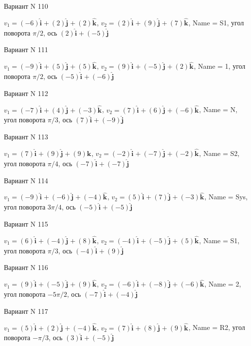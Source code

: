 \documentclass[11pt]{report}
\begin{document}
Вариант N 110

$v_1 = (-6)\mathbf{\hat{i}_{}} + (2)\mathbf{\hat{j}_{}} + (2)\mathbf{\hat{k}_{}}$, $v_2 = (2)\mathbf{\hat{i}_{}} + (9)\mathbf{\hat{j}_{}} + (7)\mathbf{\hat{k}_{}}$, Name = S1, угол поворота $\pi / 2$, ось $(2)\mathbf{\hat{i}_{}} + (-5)\mathbf{\hat{j}_{}}$

Вариант N 111

$v_1 = (-9)\mathbf{\hat{i}_{}} + (5)\mathbf{\hat{j}_{}} + (5)\mathbf{\hat{k}_{}}$, $v_2 = (9)\mathbf{\hat{i}_{}} + (-5)\mathbf{\hat{j}_{}} + (2)\mathbf{\hat{k}_{}}$, Name = 1, угол поворота $\pi / 2$, ось $(-5)\mathbf{\hat{i}_{}} + (-6)\mathbf{\hat{j}_{}}$

Вариант N 112

$v_1 = (-7)\mathbf{\hat{i}_{}} + (4)\mathbf{\hat{j}_{}} + (-3)\mathbf{\hat{k}_{}}$, $v_2 = (7)\mathbf{\hat{i}_{}} + (6)\mathbf{\hat{j}_{}} + (-6)\mathbf{\hat{k}_{}}$, Name = N, угол поворота $\pi / 3$, ось $(7)\mathbf{\hat{i}_{}} + (-9)\mathbf{\hat{j}_{}}$

Вариант N 113

$v_1 = (7)\mathbf{\hat{i}_{}} + (9)\mathbf{\hat{j}_{}} + (9)\mathbf{\hat{k}_{}}$, $v_2 = (-2)\mathbf{\hat{i}_{}} + (-7)\mathbf{\hat{j}_{}} + (-2)\mathbf{\hat{k}_{}}$, Name = S2, угол поворота $\pi / 4$, ось $(-7)\mathbf{\hat{i}_{}} + (-7)\mathbf{\hat{j}_{}}$

Вариант N 114

$v_1 = (-9)\mathbf{\hat{i}_{}} + (-6)\mathbf{\hat{j}_{}} + (-4)\mathbf{\hat{k}_{}}$, $v_2 = (5)\mathbf{\hat{i}_{}} + (7)\mathbf{\hat{j}_{}} + (-3)\mathbf{\hat{k}_{}}$, Name = Sys, угол поворота $3 \pi / 4$, ось $(-5)\mathbf{\hat{i}_{}} + (-5)\mathbf{\hat{j}_{}}$

Вариант N 115

$v_1 = (6)\mathbf{\hat{i}_{}} + (-4)\mathbf{\hat{j}_{}} + (8)\mathbf{\hat{k}_{}}$, $v_2 = (-4)\mathbf{\hat{i}_{}} + (-5)\mathbf{\hat{j}_{}} + (5)\mathbf{\hat{k}_{}}$, Name = S1, угол поворота $\pi / 3$, ось $(-4)\mathbf{\hat{i}_{}} + (9)\mathbf{\hat{j}_{}}$

Вариант N 116

$v_1 = (9)\mathbf{\hat{i}_{}} + (-5)\mathbf{\hat{j}_{}} + (9)\mathbf{\hat{k}_{}}$, $v_2 = (-6)\mathbf{\hat{i}_{}} + (-8)\mathbf{\hat{j}_{}} + (-6)\mathbf{\hat{k}_{}}$, Name = 2, угол поворота $- 5 \pi / 2$, ось $(-7)\mathbf{\hat{i}_{}} + (-4)\mathbf{\hat{j}_{}}$

Вариант N 117

$v_1 = (5)\mathbf{\hat{i}_{}} + (2)\mathbf{\hat{j}_{}} + (-4)\mathbf{\hat{k}_{}}$, $v_2 = (7)\mathbf{\hat{i}_{}} + (8)\mathbf{\hat{j}_{}} + (9)\mathbf{\hat{k}_{}}$, Name = R2, угол поворота $- \pi / 3$, ось $(3)\mathbf{\hat{i}_{}} + (-5)\mathbf{\hat{j}_{}}$
\end{document}
